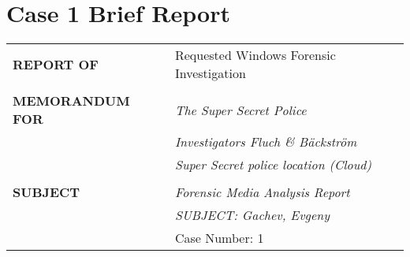 
\section{Case 1 Brief Report}


\begin{longtable}{p{}p{}}
\textbf{REPORT OF} & Requested Windows Forensic Investigation\\
&\\
\textbf{MEMORANDUM FOR} & \textit{The Super Secret Police} \\
			& \textit{Investigators Fluch \& Bäckström} \\
   & \textit{Super Secret police location (Cloud)}\\
&\\
\textbf{SUBJECT} & \textit{Forensic Media Analysis Report}\\
& \textit{SUBJECT: Gachev, Evgeny}\\
& Case Number: 1\\
\end{longtable}

